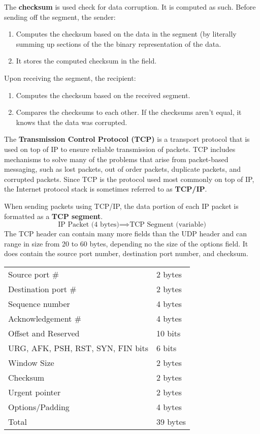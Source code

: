 \documentclass[a4paper, 12pt]{report}
\theoremstyle{remark}
\theoremstyle{definition}
\begin{document}
The \textbf{checksum} is used check for data corruption. It is computed as such. Before sending off the segment, the sender: 
\begin{enumerate}
    \item Computes the checksum based on the data in the segment (by literally summing up sections of the the binary representation of the data. 
    \item It stores the computed checksum in the field. 
\end{enumerate}
Upon receiving the segment, the recipient: 
\begin{enumerate}
    \item Computes the checksum based on the received segment. 
    \item Compares the checksums to each other. If the checksums aren't equal, it knows that the data was corrupted. 
\end{enumerate}

The \textbf{Transmission Control Protocol (TCP)} is a transport protocol that is used on top of IP to ensure reliable transmission of packets. TCP includes mechanisms to solve many of the problems that arise from packet-based messaging, such as lost packets, out of order packets, duplicate packets, and corrupted packets. Since TCP is the protocol used most commonly on top of IP, the Internet protocol stack is sometimes referred to as \textbf{TCP/IP}.  

When sending packets using TCP/IP, the data portion of each IP packet is formatted as a \textbf{TCP segment}. 
\[\text{IP Packet (4 bytes)} \implies \text{TCP Segment (variable)}\]
The TCP header can contain many more fields than the UDP header and can range in size from 20 to 60 bytes, depending no the size of the options field. It does contain the source port number, destination port number, and checksum. 
\begin{center}
\begin{tabular}{l|l}
    Source port \# & 2 bytes \\
    Destination port \# & 2 bytes \\
    Sequence number & 4 bytes \\
    Acknowledgement \# & 4 bytes \\
    Offset and Reserved & 10 bits \\
    URG, AFK, PSH, RST, SYN, FIN bits & 6 bits \\
    Window Size & 2 bytes \\
    Checksum & 2 bytes \\
    Urgent pointer & 2 bytes \\
    Options/Padding & 4 bytes \\
    \hline 
    Total & 39 bytes
\end{tabular}
\end{center}
\end{document}
